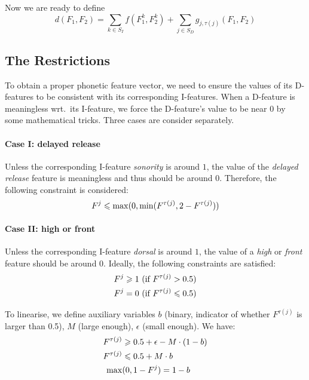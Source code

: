Now we are ready to define
\begin{equation} \label{eq:dist-func}
    d(F_1, F_2)=\sum_{k \in S_I}f(F_1^k, F_2^k)+\sum_{j \in S_D}g_{j, \tau(j)}(F_1, F_2)
\end{equation}


\subsection{The Restrictions} \label{sec:restriction}
To obtain a proper phonetic feature vector, we need to ensure the values of its D-features to be consistent with its corresponding I-features. 
When a D-feature is meaningless wrt.\ its I-feature, we force the D-feature's value to be near 0 by some mathematical tricks. 
Three cases are consider separately. 

\paragraph{Case I: delayed release} Unless the corresponding I-feature \textit{sonority} is around $1$, the value of the \textit{delayed release} feature is meaningless and thus should be around $0$. 
Therefore, the following constraint is considered:
\begin{equation} \label{constr-begin}
    \setlen
    F^{j} \leqslant \max(0, \min(F^{\tau(j)}, 2-F^{\tau(j)}))
    \end{equation}

\paragraph{Case II: high or front} Unless the corresponding I-feature \textit{dorsal} is around $1$, the value of a \textit{high} or \textit{front} feature should be around $0$. Ideally, the following constraints are satisfied:
    \begin{align}
        \setlen
        F^j \geqslant 1 \ &(\text{if }F^{\tau(j)} >0.5) \\
        F^j = 0   \ &(\text{if }F^{\tau(j)} \leqslant 0.5)
    \end{align}
    
To linearise, we define auxiliary variables $b$ (binary, indicator of whether $F^{\tau(j)}$ is larger than 0.5), $M$ (large enough), $\epsilon$ (small enough). We have:
\begin{align}\label{eq:highfront}
\setlen
    F^{\tau(j)} & \geqslant 0.5 + \epsilon - M \cdot (1 - b)\\
    F^{\tau(j)} & \leqslant 0.5 + M \cdot b\\
    \max & (0, 1-F^j)=1-b \label{M-trick}
\end{align}


